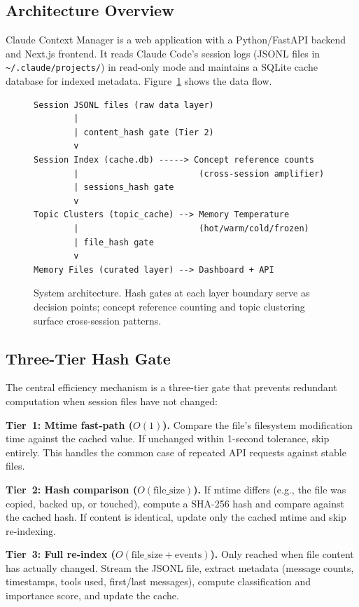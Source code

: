 \documentclass[11pt]{article}
\begin{document}
\subsection{Architecture Overview}

Claude Context Manager is a web application with a Python/FastAPI backend and Next.js frontend. It reads Claude Code's session logs (JSONL files in \texttt{\textasciitilde/.claude/projects/}) in read-only mode and maintains a SQLite cache database for indexed metadata. Figure~\ref{fig:architecture} shows the data flow.

\begin{figure}[ht]
\centering
\begin{lstlisting}
Session JSONL files (raw data layer)
        |
        | content_hash gate (Tier 2)
        v
Session Index (cache.db) -----> Concept reference counts
        |                        (cross-session amplifier)
        | sessions_hash gate
        v
Topic Clusters (topic_cache) --> Memory Temperature
        |                        (hot/warm/cold/frozen)
        | file_hash gate
        v
Memory Files (curated layer) --> Dashboard + API
\end{lstlisting}
\caption{System architecture. Hash gates at each layer boundary serve as decision points; concept reference counting and topic clustering surface cross-session patterns.}
\label{fig:architecture}
\end{figure}

\subsection{Three-Tier Hash Gate}

The central efficiency mechanism is a three-tier gate that prevents redundant computation when session files have not changed:

\textbf{Tier~1: Mtime fast-path ($O(1)$).} Compare the file's filesystem modification time against the cached value. If unchanged within 1-second tolerance, skip entirely. This handles the common case of repeated API requests against stable files.

\textbf{Tier~2: Hash comparison ($O(\text{file\_size})$).} If mtime differs (e.g., the file was copied, backed up, or touched), compute a SHA-256 hash and compare against the cached hash. If content is identical, update only the cached mtime and skip re-indexing.

\textbf{Tier~3: Full re-index ($O(\text{file\_size} + \text{events})$).} Only reached when file content has actually changed. Stream the JSONL file, extract metadata (message counts, timestamps, tools used, first/last messages), compute classification and importance score, and update the cache.
\end{document}
